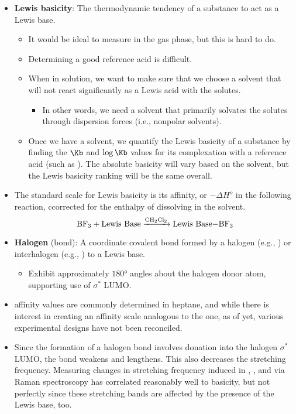 \documentclass[../notes.tex]{subfiles}
\begin{document}
\begin{itemize}
\begin{itemize}
    \end{itemize}
    \item \textbf{Lewis basicity}: The thermodynamic tendency of a substance to act as a Lewis base.
    \begin{itemize}
        \item It would be ideal to measure in the gas phase, but this is hard to do.
        \item Determining a good reference acid is difficult.
        \item When in solution, we want to make sure that we choose a solvent that will not react significantly as a Lewis acid with the solutes.
        \begin{itemize}
            \item In other words, we need a solvent that primarily solvates the solutes through dispersion forces (i.e., nonpolar solvents).
        \end{itemize}
        \item Once we have a solvent, we quantify the Lewis basicity of a substance by finding the $\Kb$ and $\log\Kb$ values for its complexation with a reference acid (such as ). The absolute basicity will vary based on the solvent, but the Lewis basicity ranking will be the same overall.
    \end{itemize}
    \item The standard scale for Lewis basicity is its  affinity, or $-\Delta H^o$ in the following reaction, ccorrected for the enthalpy of  dissolving in the solvent.
    \begin{equation*}
        \ce{BF3 + \text{Lewis Base} ->[CH2Cl2] \text{Lewis Base}-BF3}
    \end{equation*}
    \item \textbf{Halogen} (bond): A coordinate covalent bond formed by a halogen  (e.g., ) or interhalogen  (e.g., ) to a Lewis base.
    \begin{itemize}
        \item Exhibit approximately $\ang{180}$ angles about the halogen donor atom, supporting use of $\sigma^*$ LUMO.
    \end{itemize}
    \item {} affinity values are commonly determined in heptane, and while there is interest in creating an  affinity scale analogous to the  one, as of yet, various experimental designs have not been reconciled.
    \item Since the formation of a halogen bond involves donation into the halogen $\sigma^*$ LUMO, the  bond weakens and lengthens. This also decreases the stretching frequency. Measuring changes in stretching frequency induced in , , and  via Raman spectroscopy has correlated reasonably well to basicity, but not perfectly since these stretching bands are affected by the presence of the Lewis base, too.

\end{itemize}
\end{document}
